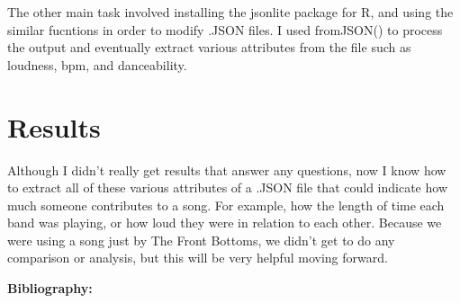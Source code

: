 \documentclass{article}\usepackage[]{graphicx}\usepackage[]{xcolor}
\begin{document}
\begin{multicols}{2}
The other main task involved installing the jsonlite \citep{jsonlite} package for R, and using the similar fucntions in order to modify .JSON files. I used fromJSON() to process the output and eventually extract various attributes from the file such as loudness, bpm, and danceability.

\section{Results}
Although I didn't really get results that answer any questions, now I know how to extract all of these various attributes of a .JSON file that could indicate how much someone contributes to a song. For example, how the length of time each band was playing, or how loud they were in relation to each other. Because we were using a song just by The Front Bottoms, we didn't get to do any comparison or analysis, but this will be very helpful moving forward.


\vspace{2em}

\noindent\textbf{Bibliography:}

\begin{tiny}

\end{tiny}
\end{multicols}
\end{document}
